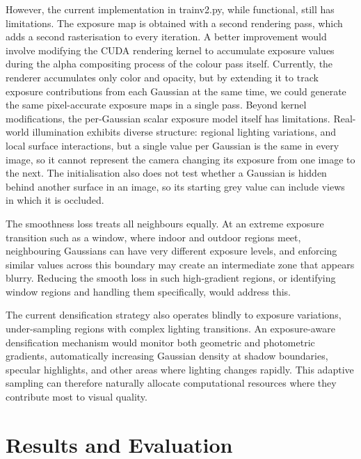 \documentclass[11pt,a4paper]{article}
\begin{document}
However, the current implementation in trainv2.py, while functional, still has limitations. The exposure map is obtained with a second rendering pass, which adds a second rasterisation to every iteration. A better improvement would involve modifying the CUDA rendering kernel to accumulate exposure values during the alpha compositing process of the colour pass itself. Currently, the renderer accumulates only color and opacity, but by extending it to track exposure contributions from each Gaussian at the same time, we could generate the same pixel-accurate exposure maps in a single pass. Beyond kernel modifications, the per-Gaussian scalar exposure model itself has limitations. Real-world illumination exhibits diverse structure: regional lighting variations, and local surface interactions, but a single value per Gaussian is the same in every image, so it cannot represent the camera changing its exposure from one image to the next. The initialisation also does not test whether a Gaussian is hidden behind another surface in an image, so its starting grey value can include views in which it is occluded.

The smoothness loss treats all neighbours equally. At an extreme exposure transition such as a window, where indoor and outdoor regions meet, neighbouring Gaussians can have very different exposure levels, and enforcing similar values across this boundary may create an intermediate zone that appears blurry. Reducing the smooth loss in such high-gradient regions, or identifying window regions and handling them specifically, would address this.

The current densification strategy also operates blindly to exposure variations, under-sampling regions with complex lighting transitions. An exposure-aware densification mechanism would monitor both geometric and photometric gradients, automatically increasing Gaussian density at shadow boundaries, specular highlights, and other areas where lighting changes rapidly. This adaptive sampling can therefore naturally allocate computational resources where they contribute most to visual quality.

\section{Results and Evaluation}
\label{sec:results}
\end{document}
